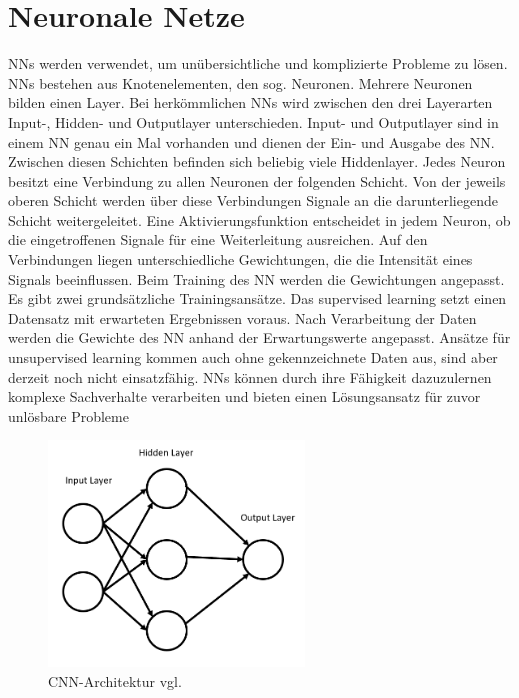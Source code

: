 \section*{Neuronale Netze}
NNs werden verwendet, um unübersichtliche und komplizierte Probleme zu lösen. NNs bestehen aus Knotenelementen, den sog. Neuronen. Mehrere Neuronen bilden einen Layer. Bei herkömmlichen NNs wird zwischen den drei Layerarten Input-, Hidden- und Outputlayer unterschieden. Input- und Outputlayer sind in einem NN genau ein Mal vorhanden und dienen der Ein- und Ausgabe des NN. Zwischen diesen Schichten befinden sich beliebig viele Hiddenlayer. Jedes Neuron besitzt eine Verbindung zu allen Neuronen der folgenden Schicht. Von der jeweils oberen Schicht werden über diese Verbindungen Signale an die darunterliegende Schicht weitergeleitet. Eine Aktivierungsfunktion entscheidet in jedem Neuron, ob die eingetroffenen Signale für eine Weiterleitung ausreichen. Auf den Verbindungen liegen unterschiedliche Gewichtungen, die die Intensität eines Signals beeinflussen. Beim Training des NN werden die Gewichtungen angepasst.
Es gibt zwei grundsätzliche Trainingsansätze. Das supervised learning setzt einen Datensatz mit erwarteten Ergebnissen voraus. Nach Verarbeitung der Daten werden die Gewichte des NN anhand der Erwartungswerte angepasst. Ansätze für unsupervised learning kommen auch ohne gekennzeichnete Daten aus, sind aber derzeit noch nicht einsatzfähig. NNs können durch ihre Fähigkeit dazuzulernen komplexe Sachverhalte verarbeiten und bieten einen Lösungsansatz für zuvor unlösbare Probleme~\cite{Maind2014}\\
\vspace{6.0cm}
\begin{figure}[h]
\includegraphics[width=\linewidth, height=6cm]{Bilder/NN/NeuralNetwork.png}
\caption{CNN-Architektur vgl. \cite{Maind2014}}
\end{figure}
\\


